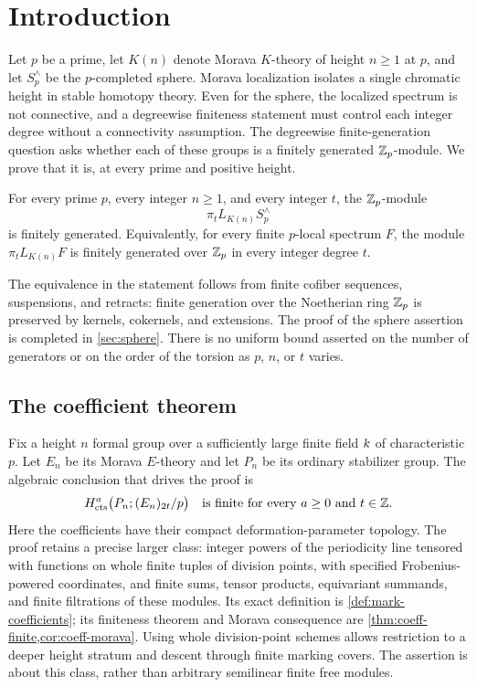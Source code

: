 \section{Introduction}\label{sec:introduction}

Let $p$ be a prime, let $K(n)$ denote Morava $K$-theory of height
$n\geq 1$ at $p$, and let $S_p^\wedge$ be the $p$-completed sphere.
Morava localization isolates a single chromatic height in stable
homotopy theory. Even for the sphere, the localized spectrum is not connective, and
a degreewise finiteness statement
must control each integer degree without a connectivity assumption.
The degreewise finite-generation question asks whether each of these
groups is a finitely generated $\mathbb Z_p$-module. We prove
that it is, at every prime and positive height.

\begin{theorem}\label{thm:main}\label{thm:descent-integral}
For every prime $p$, every integer $n\geq 1$, and every integer $t$,
the $\mathbb Z_p$-module
\[
                 \pi_t L_{K(n)}S_p^\wedge
\]
is finitely generated. Equivalently, for every finite $p$-local
spectrum $F$, the module $\pi_t L_{K(n)}F$ is finitely generated
over $\mathbb Z_p$ in every integer degree $t$.
\end{theorem}

The equivalence in the statement follows from finite cofiber sequences,
suspensions, and retracts: finite generation over the Noetherian ring
$\mathbb Z_p$ is preserved by kernels, cokernels, and extensions. The proof
of the sphere assertion is completed in \cref{sec:sphere}.
There is no uniform bound asserted on the number of generators or on
the order of the torsion as $p$, $n$, or $t$ varies.



\subsection{The coefficient theorem}

Fix a height $n$ formal group over a sufficiently large finite field
$k$ of characteristic $p$. Let $E_n$ be its Morava $E$-theory and
let $P_n$ be its ordinary stabilizer group. The algebraic conclusion
that drives the proof is
\begin{equation}\label{eq:intro-coefficients}
 H^a_{\mathrm{cts}}\bigl(P_n;(E_n)_{2t}/p\bigr)
 \quad\text{is finite for every }a\geq0\text{ and }t\in\mathbb Z.
\end{equation}
Here the coefficients have their compact deformation-parameter
topology. The proof retains a precise larger class: integer powers of
the periodicity line tensored with functions on whole finite tuples of
division points, with specified Frobenius-powered coordinates, and
finite sums, tensor products, equivariant summands, and finite
filtrations of these modules. Its exact definition is
\cref{def:mark-coefficients}; its finiteness theorem and Morava
consequence are \cref{thm:coeff-finite,cor:coeff-morava}.
Using whole division-point schemes allows restriction to a deeper
height stratum and descent through finite marking covers. The assertion
is about this class, rather than arbitrary semilinear finite free
modules.

